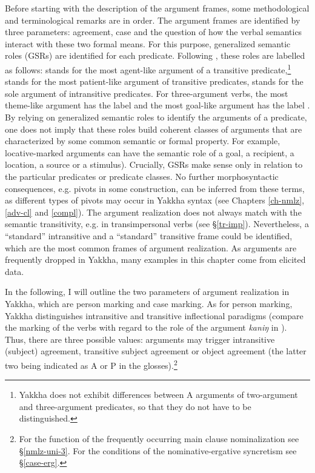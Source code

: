 Before starting with the description of the argument frames, some methodological and terminological remarks are in order. The argument frames are identified by three parameters:  agreement,  case and the question of how the verbal semantics interact with these two formal means. For this purpose, generalized semantic roles (GSRs) are identified for each predicate. Following \citet{Bickel2010_Grammatical}, these roles are labelled as follows:  stands for the most agent-like argument of a transitive predicate,\footnote{Yakkha does not exhibit differences between A arguments of two-argument and three-argument predicates, so that they do not have to be distinguished.}  stands for the most patient-like argument of transitive predicates,  stands for the sole argument of intransitive predicates. For three-argument verbs, the most theme-like argument has the label  and the most goal-like argument has the label .  By relying on generalized semantic roles to identify the arguments of a predicate, one does not imply that these roles build coherent  classes of arguments that are characterized by some common semantic or formal property. For example, locative-marked arguments can have the semantic role of a goal, a recipient, a location, a source or a stimulus). Crucially, GSRs make sense only in relation to the particular predicates or predicate classes. No further morphosyntactic consequences, e.g. pivots in some construction, can be inferred from these terms, as different types of pivots may occur in Yakkha syntax (see Chapters \ref{ch-nmlz}, \ref{adv-cl} and \ref{compl}). The argument realization does not always match with the semantic transitivity, e.g. in transimpersonal verbs (see §\ref{tr-imp}). Nevertheless, a “standard” intransitive and a “standard” transitive frame could be identified, which are the most common frames of argument realization. As arguments are frequently dropped in Yakkha, many examples in this chapter come from elicited data.

In the following, I will outline the two parameters of argument realization in Yakkha, which are person marking and case marking. 
As for person marking, Yakkha distinguishes intransitive and transitive inflectional paradigms (compare the marking of the verbs with regard to the role of the  argument \emph{kaniŋ} in \Next). Thus, there are three possible values: arguments may trigger intransitive (subject) agreement, transitive subject agreement or object agreement (the latter two being indicated as A or P in the glosses).\footnote{For the function of the frequently occurring main clause nominalization see §\ref{nmlz-uni-3}. For the conditions of the nominative-ergative syncretism see §\ref{case-erg}.} 

